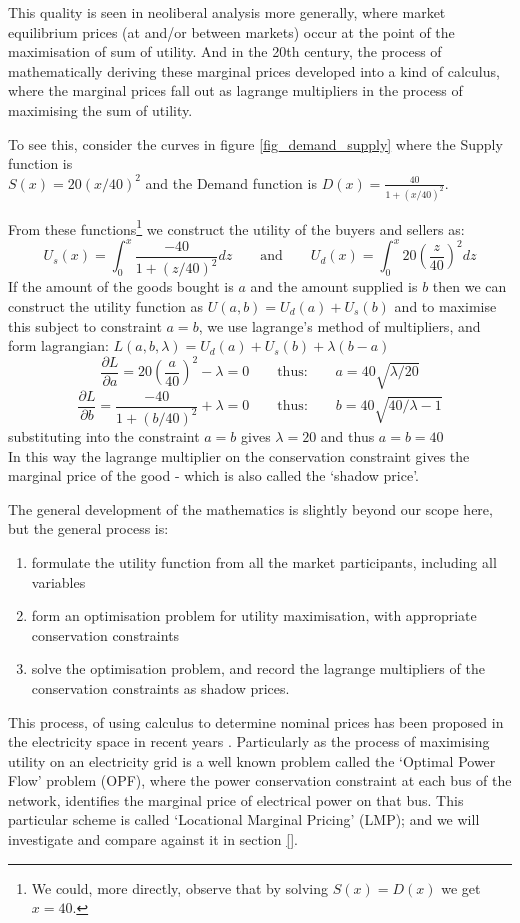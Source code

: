 This quality is seen in neoliberal analysis more generally, where market equilibrium prices (at and/or between markets) occur at the point of the maximisation of sum of utility.
And in the 20th century, the process of mathematically deriving these marginal prices developed into a kind of calculus, where the marginal prices fall out as lagrange multipliers in the process of maximising the sum of utility.

To see this, consider the curves in figure \ref{fig_demand_supply} where the Supply function is\\ $S(x) = 20(x/40)^2$ and the Demand function is $D(x) = \frac{40}{1+(x/40)^2}$.


From these functions\footnote{We could, more directly, observe that by solving $S(x)=D(x)$ we get $x=40$.} we construct the utility of the buyers and sellers as:
$$U_s(x) = \int_0^x\frac{-40}{1+(z/40)^2}dz \quad\quad\text{and}\quad\quad U_d(x) = \int_0^x20\left(\frac{z}{40}\right)^2dz$$
If the amount of the goods bought is $a$ and the amount supplied is $b$ then we can construct the utility function as $U(a,b) = U_d(a) + U_s(b)$
and to maximise this subject to constraint $a=b$, we use lagrange's method of multipliers, and form lagrangian:
$L(a,b,\lambda) = U_d(a) + U_s(b) + \lambda(b-a)$
$$\frac{\partial L}{\partial a} = 20\left(\frac{a}{40}\right)^2 - \lambda = 0 \quad\quad\text{thus:}\quad\quad a = 40\sqrt{\lambda/20}$$
$$\frac{\partial L}{\partial b} = \frac{-40}{1+(b/40)^2} + \lambda = 0 \quad\quad\text{thus:}\quad\quad b = 40\sqrt{40/\lambda - 1}$$
substituting into the constraint $a=b$ gives $\lambda=20$ and thus $a=b=40$\\
In this way the lagrange multiplier on the conservation constraint gives the marginal price of the good - which is also called the `shadow price'.

The general development of the mathematics is slightly beyond our scope here, but the general process is:
\begin{enumerate}
\item formulate the utility function from all the market participants, including all variables
\item form an optimisation problem for utility maximisation, with appropriate conservation constraints
\item solve the optimisation problem, and record the lagrange multipliers of the conservation constraints as shadow prices.
\end{enumerate}
This process, of using calculus to determine nominal prices has been proposed in the electricity space in recent years \cite{lmp1, lmp2, lmp4, game3}.
Particularly as the process of maximising utility on an electricity grid is a well known problem called the `Optimal Power Flow' problem (OPF), where the power conservation constraint at each bus of the network, identifies the marginal price of electrical power on that bus.
This particular scheme is called `Locational Marginal Pricing' (LMP); and we will investigate and compare against it in section \ref{}.




